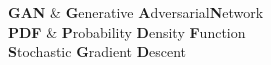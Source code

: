 \clearpage
\pagestyle{fancy} %
{
   \textbf{GAN} & \textbf{G}enerative \textbf{A}dversarial\textbf{N}etwork \\
   \textbf{PDF} & \textbf{P}robability \textbf{D}ensity \textbf{F}unction\\
   \textbf{S}tochastic \textbf{G}radient \textbf{D}escent\\
}

